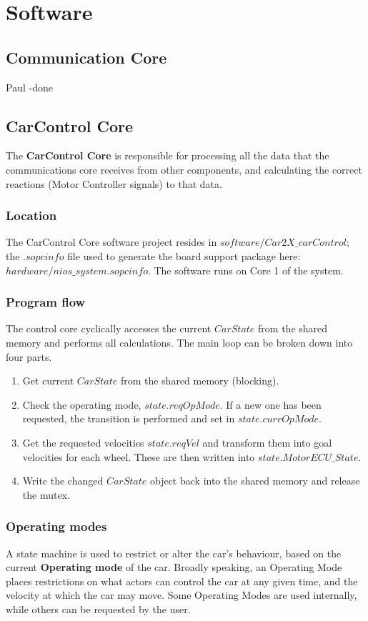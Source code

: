 \chapter{Software}

\section{Communication Core}
Paul -done

\section{CarControl Core}
The \textbf{CarControl Core} is responsible for processing all the data that the communications core receives from other components, and calculating the correct reactions (Motor Controller signals) to that data. 

\subsection{Location}
The CarControl Core software project resides in $software/Car2X\_carControl$; the $.sopcinfo$ file used to generate the board support package here: \\$hardware/nios\_system.sopcinfo$. The software runs on Core 1 of the system.

\subsection{Program flow}
The control core cyclically accesses the current $CarState$ from the shared memory and performs all calculations. The main loop can be broken down into four parts.

\begin{enumerate}
\item Get current $CarState$ from the shared memory (blocking).
\item Check the operating mode, $state.reqOpMode$. If a new one has been requested, the transition is performed and set in $state.currOpMode$.
\item Get the requested velocities $state.reqVel$ and transform them into goal velocities for each wheel. These are then written into $state.MotorECU\_State$.
\item Write the changed $CarState$ object back into the shared memory and release the mutex.
\end{enumerate}

\subsection{Operating modes}
A state machine is used to restrict or alter the car's behaviour, based on the current \textbf{Operating mode} of the car. Broadly speaking, an Operating Mode places restrictions on what actors can control the car at any given time, and the velocity at which the car may move. Some Operating Modes are used internally, while others can be requested by the user.


